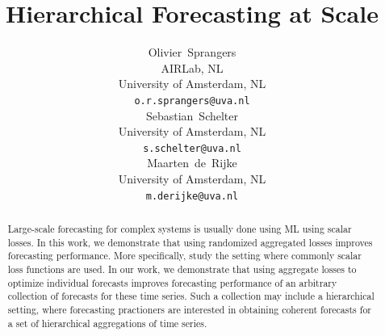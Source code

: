 \documentclass{article}
\title{Hierarchical Forecasting at Scale}
\author{%
  Olivier~Sprangers \\
  AIRLab, NL \\
  University of Amsterdam, NL\\
  \texttt{o.r.sprangers@uva.nl} \\
  \And
  Sebastian~Schelter \\
  University of Amsterdam, NL \\
  \texttt{s.schelter@uva.nl} \\
  \And
  Maarten~de~Rijke \\
  University of Amsterdam, NL \\
  \texttt{m.derijke@uva.nl} \\
}
\begin{document}
\maketitle

\begin{abstract}
  Large-scale forecasting for complex systems is usually done using ML using scalar losses. In this work, we demonstrate that using randomized aggregated losses improves forecasting performance. More specifically, study the setting where commonly scalar loss functions are used. In our work, we demonstrate that using aggregate losses to optimize individual forecasts improves forecasting performance of an arbitrary collection of forecasts for these time series. Such a collection may include a hierarchical setting, where forecasting practioners are interested in obtaining coherent forecasts for a set of hierarchical aggregations of time series.

\end{abstract}
\end{document}
